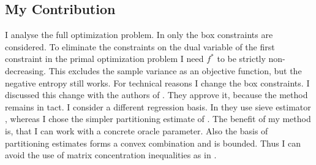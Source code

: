 %
%
%
\subsection*{My Contribution}
I analyse the full optimization problem. In \cite{Wang2019} only the box constraints are considered.
To eliminate the constraints on the dual variable of the first constraint in the primal optimization problem I need $f^*$ to be strictly non-decreasing. This excludes the sample variance as an objective function, but the negative entropy still works.
For technical reasons I change the box constraints. I discussed this change with the authors of \cite{Wang2019}. They approve it, because the method remains in tact.
I consider a different regression basis. In \cite{Wang2019} they use sieve estimator \cite{Newey1997a}, whereas I chose the simpler partitioning estimate of \cite{Gyorfi2002}.
The benefit of my method is, that I can work with a concrete oracle parameter.
Also the basis of partitioning estimates forms a convex combination and is bounded. Thus I can avoid the use of matrix concentration inequalities as in \cite{Wang2019}.

